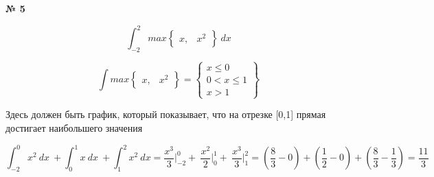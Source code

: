 \documentclass{article}
\begin{document}
\textbf{№ 5} 
\large

$$ \int_{-2}^{2} max    
    \left\{
    \begin{array}{ccc}
     x, & x^2
     \end{array}
     \right\} \ dx
$$

$$ \int max 
    \left\{
    \begin{array}{ccc}
     x, & x^2
     \end{array}
     \right\}
=     \left\{
    \begin{array}{ccc}
     x \leq 0 \\
     0 < x \leq 1 \\
     x > 1
     \end{array}
     \right\} $$

Здесь должен быть график, который показывает, что на отрезке [0,1] прямая достигает наибольшего значения

$$ \int_{-2}^{0} x^2 \ dx \ + \int_{0}^{1} x \ dx \ + \int_{1}^{2} x^2 \ dx
= \frac{x^3}{3} \bigg\vert_{-2}^{0} + \ \frac{x^2}{2} \bigg\vert_{0}^{1} + \ \frac{x^3}{3} \bigg\vert_{1}^{2}
= \left( \frac{8}{3} - 0 \right) + \left( \frac{1}{2} - 0 \right) + \left( \frac{8}{3} - \frac{1}{3} \right) 
= \frac{11}{3}$$

$$ $$
\end{document}
